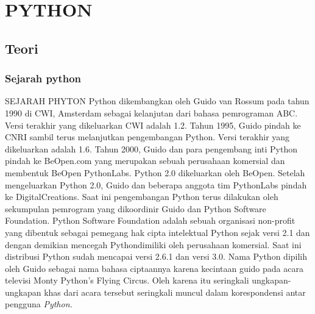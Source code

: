 \chapter{PYTHON}

\section{Teori}
\subsection{Sejarah python}
\par
SEJARAH PHYTON
Python dikembangkan oleh Guido van Rossum pada tahun 1990 di CWI, Amsterdam sebagai kelanjutan dari bahasa pemrograman ABC. Versi terakhir yang dikeluarkan CWI adalah 1.2.
Tahun 1995, Guido pindah ke CNRI sambil terus melanjutkan pengembangan Python. Versi terakhir yang dikeluarkan adalah 1.6. Tahun 2000, Guido dan para pengembang inti Python pindah ke BeOpen.com yang merupakan sebuah perusahaan komersial dan membentuk BeOpen PythonLabs. Python 2.0 dikeluarkan oleh BeOpen. Setelah mengeluarkan Python 2.0, Guido dan beberapa anggota tim PythonLabs pindah ke DigitalCreations.
Saat ini pengembangan Python terus dilakukan oleh sekumpulan pemrogram yang dikoordinir Guido dan Python Software Foundation. Python Software Foundation adalah sebuah organisasi non-profit yang dibentuk sebagai pemegang hak cipta intelektual Python sejak versi 2.1 dan dengan demikian mencegah Pythondimiliki oleh perusahaan komersial. Saat ini distribusi Python sudah mencapai versi 2.6.1 dan versi 3.0. Nama Python dipilih oleh Guido sebagai nama bahasa ciptaannya karena kecintaan guido pada acara televisi Monty Python's Flying Circus. Oleh karena itu seringkali ungkapan-ungkapan khas dari acara tersebut seringkali muncul dalam korespondensi antar pengguna \textit{Python.}

